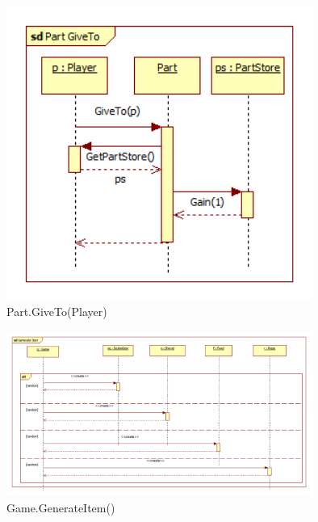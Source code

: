 \begin{figure}[H]
	\begin{center}
		\includegraphics[width=10cm]{chapters/chapter03/seqdiag/Part_GiveTo.png}
		\caption{Part.GiveTo(Player)}
		\label{fig:PartGiveTo}
	\end{center}
\end{figure}
\begin{figure}[H]
	\begin{center}
		\includegraphics[width=10cm]{chapters/chapter03/seqdiag/Game_generate_item.png}
		\caption{Game.GenerateItem()}
		\label{fig:GameGenerateItem}
	\end{center}
\end{figure}
